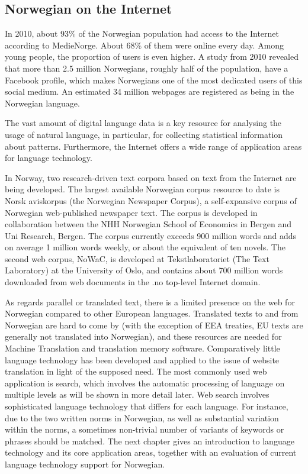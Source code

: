 \begin{multicols}{2}
\subsection{Norwegian on the Internet}

In 2010, about 93\% of the Norwegian population had access to the Internet according to MedieNorge.
About 68\% of them were online every day. 
Among young people, the proportion of users is even higher. 
A study from 2010 revealed that more than 2.5 million Norwegians, roughly half of the population, have a Facebook profile, which makes Norwegians one of the most dedicated users of this social medium. 
An estimated 34 million webpages are registered as being in the Norwegian language.


The vast amount of digital language data is a key resource for analysing the usage of natural language, in particular, for collecting statistical information about patterns. 
Furthermore, the Internet offers a wide range of application areas for language technology. 

In Norway, two research-driven text corpora based on text from the Internet are being developed. 
The largest available Norwegian corpus resource to date is Norsk aviskorpus (the Norwegian Newspaper Corpus), a self-expansive corpus of Norwegian web-published newspaper text.
The corpus is developed in collaboration between the NHH Norwegian School of Economics in Bergen and Uni Research, Bergen. 
The corpus currently exceeds 900 million words and adds on average 1 million words weekly, or about the equivalent of ten novels.
The second web corpus, NoWaC, is developed at Tekstlaboratoriet (The Text Laboratory) at the University of Oslo, and contains about 700 million words downloaded from web documents in the .no top-level Internet domain.

As regards parallel or translated text, there is a limited presence on the web for Norwegian compared to other European languages. 
Translated texts to and from Norwegian are hard to come by (with the exception of EEA treaties, EU texts are generally not translated into Norwegian), and these resources are needed for Machine Translation and translation memory software. 
Comparatively little language technology has been developed and applied to the issue of website translation in light of the supposed need.
The most commonly used web application is search, which involves the automatic processing of language on multiple levels as will be shown in more detail later. 
Web search involves sophisticated language technology that differs for each language. 
For instance, due to the two written norms in Norwegian, as well as substantial variation within the norms, a sometimes non-trivial number of variants of keywords or phrases should be matched. 
The next chapter gives an introduction to language technology and its core application areas, together with an evaluation of current language technology support for Norwegian.

\end{multicols}

